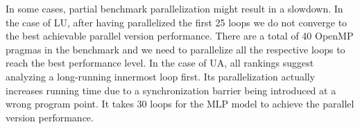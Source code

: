 

In some cases, partial benchmark parallelization might result in a slowdown. In the case of LU, after having parallelized the first 25 loops we do not converge to the best achievable parallel version performance. There are a total of 40 OpenMP pragmas in the benchmark and we need to parallelize all the respective loops to reach the best performance level. In the case of UA, all rankings suggest analyzing a long-running innermost loop first. Its parallelization actually increases running time due to a synchronization barrier being introduced at a wrong program point. It takes 30 loops for the MLP model to achieve the parallel version performance.

